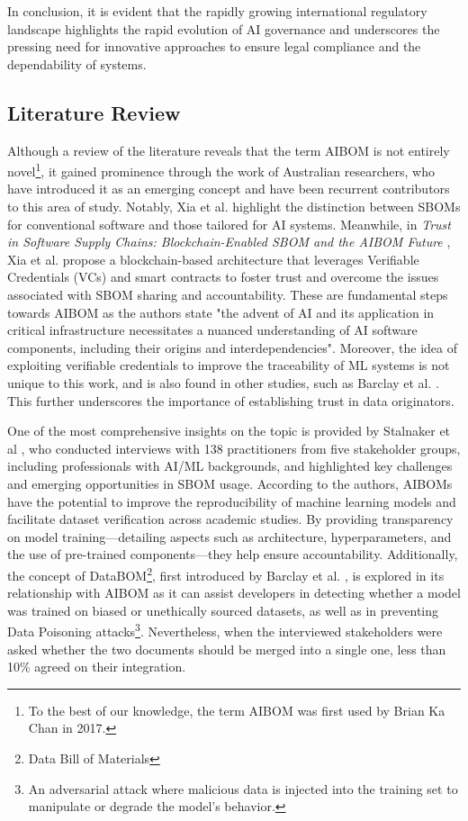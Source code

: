In conclusion, it is evident that the rapidly growing international regulatory landscape highlights the rapid evolution of AI governance and underscores the pressing need for innovative approaches to ensure legal compliance and the dependability of systems.


\subsection{Literature Review}
Although a review of the literature reveals that the term AIBOM is not entirely novel\footnote{To the best of our knowledge, the term AIBOM was first used by Brian Ka Chan in 2017.}, it gained prominence through the work of Australian researchers, who have introduced it as an emerging concept and have been recurrent contributors to this area of study. Notably, Xia et al. \cite{xia2024empirical} highlight the distinction between SBOMs for conventional software and those tailored for AI systems. Meanwhile, in \textit{Trust in Software Supply Chains: Blockchain-Enabled SBOM and the AIBOM Future} \cite{xia2024trust}, Xia et al. propose a blockchain-based architecture that leverages Verifiable Credentials (VCs) and smart contracts to foster trust and overcome the issues associated with SBOM sharing and accountability. These are fundamental steps towards AIBOM as the authors state "the advent of AI and its application in critical infrastructure necessitates a nuanced understanding of AI software components, including their origins and interdependencies". Moreover, the idea of exploiting verifiable credentials to improve the traceability of ML systems is not unique to this work, and is also found in other studies, such as Barclay et al. \cite{barclay2022providing}. This further underscores the importance of establishing trust in data originators.


One of the most comprehensive insights on the topic is provided by Stalnaker et al \cite{stalnaker2024boms}, who conducted interviews with 138 practitioners from five stakeholder groups, including professionals with AI/ML backgrounds, and highlighted key challenges and emerging opportunities in SBOM usage. According to the authors, AIBOMs have the potential to improve the reproducibility of machine learning models and facilitate dataset verification across academic studies. By providing transparency on model training—detailing aspects such as architecture, hyperparameters, and the use of pre-trained components—they help ensure accountability. Additionally, the concept of DataBOM\footnote{Data Bill of Materials}, first introduced by Barclay et al. \cite{Barclay2019}, is explored in its relationship with AIBOM as it can assist developers in detecting whether a model was trained on biased or unethically sourced datasets, as well as in preventing Data Poisoning attacks\footnote{An adversarial attack where malicious data is injected into the training set to manipulate or degrade the model’s behavior.}. Nevertheless, when the interviewed stakeholders were asked whether the two documents should be merged into a single one, less than 10\% agreed on their integration.



